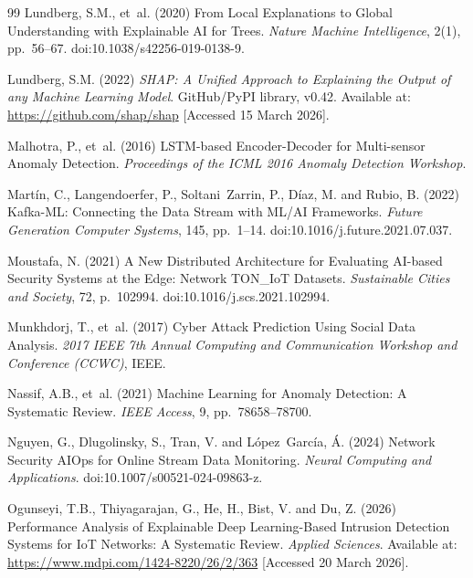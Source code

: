 \documentclass[12pt,a4paper]{report}
\begin{document}
\begin{thebibliography}{99}
Lundberg, S.M., et~al. (2020) From Local Explanations to Global Understanding with Explainable AI for Trees. \textit{Nature Machine Intelligence}, 2(1), pp.~56--67. doi:10.1038/s42256-019-0138-9.

Lundberg, S.M. (2022) \textit{SHAP: A Unified Approach to Explaining the Output of any Machine Learning Model}. GitHub/PyPI library, v0.42. Available at: \url{https://github.com/shap/shap} [Accessed 15 March 2026].

Malhotra, P., et~al. (2016) LSTM-based Encoder-Decoder for Multi-sensor Anomaly Detection. \textit{Proceedings of the ICML 2016 Anomaly Detection Workshop}.

Mart\'{i}n, C., Langendoerfer, P., Soltani~Zarrin, P., D\'{i}az, M. and Rubio, B. (2022) Kafka-ML: Connecting the Data Stream with ML/AI Frameworks. \textit{Future Generation Computer Systems}, 145, pp.~1--14. doi:10.1016/j.future.2021.07.037.

Moustafa, N. (2021) A New Distributed Architecture for Evaluating AI-based Security Systems at the Edge: Network TON\_IoT Datasets. \textit{Sustainable Cities and Society}, 72, p.~102994. doi:10.1016/j.scs.2021.102994.

Munkhdorj, T., et~al. (2017) Cyber Attack Prediction Using Social Data Analysis. \textit{2017 IEEE 7th Annual Computing and Communication Workshop and Conference (CCWC)}, IEEE.

Nassif, A.B., et~al. (2021) Machine Learning for Anomaly Detection: A Systematic Review. \textit{IEEE Access}, 9, pp.~78658--78700.

Nguyen, G., Dlugolinsky, S., Tran, V. and L\'{o}pez~Garc\'{i}a, \'{A}. (2024) Network Security AIOps for Online Stream Data Monitoring. \textit{Neural Computing and Applications}. doi:10.1007/s00521-024-09863-z.

Ogunseyi, T.B., Thiyagarajan, G., He, H., Bist, V. and Du, Z. (2026) Performance Analysis of Explainable Deep Learning-Based Intrusion Detection Systems for IoT Networks: A Systematic Review. \textit{Applied Sciences}. Available at: \url{https://www.mdpi.com/1424-8220/26/2/363} [Accessed 20 March 2026].


\end{thebibliography}
\end{document}
